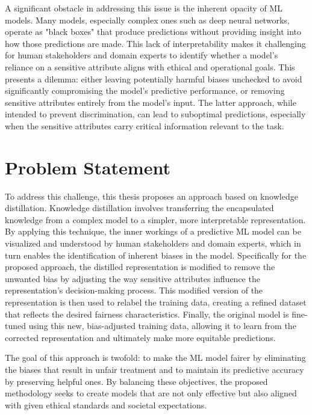 A significant obstacle in addressing this issue is the inherent opacity of ML models.
Many models, especially complex ones such as deep neural networks,
operate as "black boxes" that produce predictions without providing insight into how those predictions are made.
This lack of interpretability makes it challenging for human stakeholders and domain experts
to identify whether a model's reliance on a sensitive attribute aligns with ethical and operational goals. 
This presents a dilemma:
either leaving potentially harmful biases unchecked to avoid significantly compromising
the model's predictive performance,
or removing sensitive attributes entirely from the model's input.
The latter approach, while intended to prevent discrimination, can lead to suboptimal predictions,
especially when the sensitive attributes carry critical information relevant to the task.

\section{Problem Statement}
To address this challenge,
this thesis proposes an approach based on knowledge distillation.
Knowledge distillation involves transferring the encapsulated knowledge from a complex model to a simpler,
more interpretable representation.
By applying this technique,
the inner workings of a predictive ML model can be visualized
and understood by human stakeholders and domain experts,
which in turn enables the identification of inherent biases in the model.
Specifically for the proposed approach,
the distilled representation is modified to remove the unwanted bias
by adjusting the way sensitive attributes influence the representation's decision-making process.
This modified version of the representation is then used to relabel the training data,
creating a refined dataset that reflects the desired fairness characteristics.
Finally, the original model is fine-tuned using this new, bias-adjusted training data,
allowing it to learn from the corrected representation and ultimately make more equitable predictions.

The goal of this approach is twofold:
to make the ML model fairer by eliminating the biases that result in unfair treatment
and to maintain its predictive accuracy by preserving helpful ones.
By balancing these objectives,
the proposed methodology seeks to create models that are not only effective
but also aligned with given ethical standards and societal expectations.

